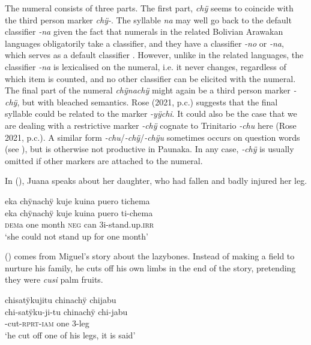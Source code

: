 The numeral consists of three parts. The first part, \textit{chÿ} seems to coincide with the third person marker \textit{chÿ-}. The syllable \textit{na} may well go back to the default classifier \textit{-na} given the fact that numerals in the related Bolivian Arawakan languages obligatorily take a classifier, and they have a classifier \textit{-no} or \textit{-na}, which serves as a default classifier \citep[147--148]{Terhart2016}. However, unlike in the related languages, the classifier \textit{-na} is lexicalised on the numeral, i.e. it never changes, regardless of which item is counted, and no other classifier can be elicited with the numeral. The final part of the numeral \textit{chÿnachÿ} might again be a third person marker \textit{-chÿ}, but with bleached semantics. Rose (2021, p.c.) suggests that the final syllable could be related to the  marker \textit{-yÿchi}. It could also be the case that we are dealing with a restrictive marker \textit{-chÿ} cognate to  Trinitario \textit{-chu} here (Rose 2021, p.c.). A similar form \textit{-chu}/\textit{-chÿ}/\textit{-chÿu} sometimes occurs on question words (see ), but is otherwise not productive in Paunaka. In any case, \textit{-chÿ} is usually omitted if other markers are attached to the numeral.

In (), Juana speaks about her daughter, who had fallen and badly injured her leg.

\ea\label{ex:one-1}
\begingl
\glpreamble eka chÿnachÿ kuje kuina puero tichema\\
\gla eka chÿnachÿ kuje kuina puero ti-chema\\
\glb \textsc{dem}a one month \textsc{neg} can 3i-stand.up.\textsc{irr}\\
\glft ‘she could not stand up for one month’
\endgl
\trailingcitation{[jxx-p110923l-1.474]}
\xe

() comes from Miguel’s story about the lazybones. Instead of making a field to nurture his family, he cuts off his own limbs in the end of the story, pretending they were \textit{cusi} palm fruits.

\ea\label{ex:one-2}
\begingl
\glpreamble chisatÿkujitu chinachÿ chijabu\\
\gla chi-satÿku-ji-tu chinachÿ chi-jabu\\
-cut-\textsc{rprt}-\textsc{iam} one 3-leg\\
\glft ‘he cut off one of his legs, it is said’
\endgl
\trailingcitation{[mox-n110920l.097]}
\xe


